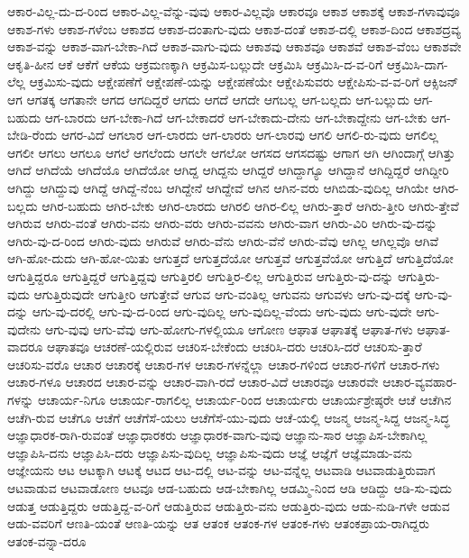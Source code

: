 {ಆಕಾರ-ವಿಲ್ಲ-ದು-ದ-ರಿಂದ
ಆಕಾರ-ವಿಲ್ಲ-ವೆನ್ನು-ವುವು
ಆಕಾರ-ವಿಲ್ಲವೊ
ಆಕಾರವೂ
ಆಕಾಶ
ಆಕಾಶಕ್ಕೆ
ಆಕಾಶ-ಗಳಾವುವೂ
ಆಕಾಶ-ಗಳು
ಆಕಾಶ-ಗಳೆಂಬ
ಆಕಾಶದ
ಆಕಾಶ-ದಂತಾಗು-ವುದು
ಆಕಾಶ-ದಂತೆ
ಆಕಾಶ-ದಲ್ಲಿ
ಆಕಾಶ-ದಿಂದ
ಆಕಾಶದ್ರವ್ಯ
ಆಕಾಶ-ವನ್ನು
ಆಕಾಶ-ವಾಗ-ಬೇಕಾ-ಗಿದೆ
ಆಕಾಶ-ವಾಗು-ವುದು
ಆಕಾಶವು
ಆಕಾಶವೂ
ಆಕಾಶವೆ
ಆಕಾಶ-ವೆಂಬ
ಆಕಾಶವೇ
ಆಕೃತಿ-ಹೀನ
ಆಕೆ
ಆಕೆಗೆ
ಆಕೆಯ
ಆಕ್ರಮಣಕ್ಕಾಗಿ
ಆಕ್ರಮಿಸ-ಬಲ್ಲುದೇ
ಆಕ್ರಮಿಸಿ
ಆಕ್ರಮಿಸಿ-ದ-ವ-ರಿಗೆ
ಆಕ್ರಮಿಸಿ-ದಾಗ-ಲೆಲ್ಲ
ಆಕ್ರಮಿಸು-ವುದು
ಆಕ್ಷೇಪಣೆಗೆ
ಆಕ್ಷೇಪಣೆ-ಯನ್ನು
ಆಕ್ಷೇಪಣೆಯೇ
ಆಕ್ಷೇಪಿಸುವರು
ಆಕ್ಷೇಪಿಸು-ವ-ವ-ರಿಗೆ
ಆಕ್ಸಿಜನ್
ಆಗ
ಆಗತಕ್ಕ
ಆಗತಾನೇ
ಆಗದ
ಆಗದಿದ್ದರೆ
ಆಗದು
ಆಗದೆ
ಆಗದೇ
ಆಗಬಲ್ಲ
ಆಗ-ಬಲ್ಲದು
ಆಗ-ಬಲ್ಲುದು
ಆಗ-ಬಹುದು
ಆಗ-ಬಾರದು
ಆಗ-ಬೇಕಾ-ಗಿದೆ
ಆಗ-ಬೇಕಾದರೆ
ಆಗ-ಬೇಕಾದು-ದೇನು
ಆಗ-ಬೇಕಾದ್ದೇನು
ಆಗ-ಬೇಕು
ಆಗ-ಬೇಡಿ-ರೆಂದು
ಆಗರ-ವಿದೆ
ಆಗಲಾರ
ಆಗ-ಲಾರದು
ಆಗ-ಲಾರರು
ಆಗ-ಲಾರವು
ಆಗಲಿ
ಆಗಲಿ-ರು-ವುದು
ಆಗಲಿಲ್ಲ
ಆಗಲೀ
ಆಗಲು
ಆಗಲೂ
ಆಗಲೆ
ಆಗಲೆಂದು
ಆಗಲೇ
ಆಗಲೋ
ಆಗಸದ
ಆಗಸದಷ್ಟು
ಆಗಾಗ
ಆಗಿ
ಆಗಿಂದಾಗ್ಗೆ
ಆಗಿತ್ತು
ಆಗಿದೆ
ಆಗಿದೆಯೆ
ಆಗಿದೆಯೊ
ಆಗಿದೆಯೋ
ಆಗಿದ್ದ
ಆಗಿದ್ದನು
ಆಗಿದ್ದರೆ
ಆಗಿದ್ದಾಗ್ಯೂ
ಆಗಿದ್ದಾನೆ
ಆಗಿದ್ದಿದ್ದರೆ
ಆಗಿದ್ದೀರಿ
ಆಗಿದ್ದು
ಆಗಿದ್ದುವು
ಆಗಿದ್ದೆ
ಆಗಿದ್ದೆ-ನೆಂಬ
ಆಗಿದ್ದೇನೆ
ಆಗಿದ್ದೇವೆ
ಆಗಿನ
ಆಗಿನ-ವರು
ಆಗಿಬಿಡು-ವುದಿಲ್ಲ
ಆಗಿಯೇ
ಆಗಿರ-ಬಲ್ಲದು
ಆಗಿರ-ಬಹುದು
ಆಗಿರ-ಬೇಕು
ಆಗಿರ-ಲಾರದು
ಆಗಿರಲಿ
ಆಗಿರ-ಲಿಲ್ಲ
ಆಗಿರು-ತ್ತಾರೆ
ಆಗಿರು-ತ್ತೀರಿ
ಆಗಿರು-ತ್ತೇವೆ
ಆಗಿರುವ
ಆಗಿರು-ವಂತೆ
ಆಗಿರು-ವನು
ಆಗಿರು-ವರು
ಆಗಿರು-ವವನು
ಆಗಿರು-ವಾಗ
ಆಗಿರು-ವಿರಿ
ಆಗಿರು-ವು-ದನ್ನು
ಆಗಿರು-ವು-ದ-ರಿಂದ
ಆಗಿರು-ವುದು
ಆಗಿರುವೆ
ಆಗಿರು-ವೆನು
ಆಗಿರು-ವೆನೆ
ಆಗಿರು-ವೆವು
ಆಗಿಲ್ಲ
ಆಗಿಲ್ಲವೊ
ಆಗಿವೆ
ಆಗಿ-ಹೋ-ದುದು
ಆಗಿ-ಹೋ-ಯಿತು
ಆಗುತ್ತದೆ
ಆಗುತ್ತದೆಯೋ
ಆಗುತ್ತವೆ
ಆಗುತ್ತವೆಯೋ
ಆಗುತ್ತಿದೆ
ಆಗುತ್ತಿದೆಯೋ
ಆಗುತ್ತಿದ್ದರೂ
ಆಗುತ್ತಿದ್ದರೆ
ಆಗುತ್ತಿದ್ದವು
ಆಗುತ್ತಿರಲಿ
ಆಗುತ್ತಿರ-ಲಿಲ್ಲ
ಆಗುತ್ತಿರುವ
ಆಗುತ್ತಿರು-ವು-ದನ್ನು
ಆಗುತ್ತಿರು-ವುದು
ಆಗುತ್ತಿರುವುದೇ
ಆಗುತ್ತೀರಿ
ಆಗುತ್ತೇವೆ
ಆಗುವ
ಆಗು-ವಂತಿಲ್ಲ
ಆಗುವನು
ಆಗುವಳು
ಆಗು-ವು-ದಕ್ಕೆ
ಆಗು-ವು-ದನ್ನು
ಆಗು-ವು-ದರಲ್ಲಿ
ಆಗು-ವು-ದ-ರಿಂದ
ಆಗು-ವುದಿಲ್ಲ
ಆಗು-ವುದಿಲ್ಲ-ವೆಂದು
ಆಗು-ವುದು
ಆಗು-ವುದೇ
ಆಗು-ವುದೇನು
ಆಗು-ವುವು
ಆಗು-ವೆವು
ಆಗು-ಹೋಗು-ಗಳಲ್ಲಿಯೂ
ಆಗೋಣ
ಆಘಾತ
ಆಘಾತಕ್ಕೆ
ಆಘಾತ-ಗಳು
ಆಘಾತ-ವಾದರೂ
ಆಘಾತವೂ
ಆಚರಣೆ-ಯಲ್ಲಿರುವ
ಆಚರಿಸ-ಬೇಕೆಂದು
ಆಚರಿಸಿ-ದರು
ಆಚರಿಸಿ-ದರೆ
ಆಚರಿಸು-ತ್ತಾರೆ
ಆಚರಿಸು-ವರೊ
ಆಚಾರ
ಆಚಾರಕ್ಕೆ
ಆಚಾರ-ಗಳ
ಆಚಾರ-ಗಳನ್ನೆಲ್ಲಾ
ಆಚಾರ-ಗಳಿಂದ
ಆಚಾರ-ಗಳಿಗೆ
ಆಚಾರ-ಗಳು
ಆಚಾರ-ಗಳೂ
ಆಚಾರದ
ಆಚಾರ-ವನ್ನು
ಆಚಾರ-ವಾಗಿ-ರದೆ
ಆಚಾರ-ವಿದೆ
ಆಚಾರವೂ
ಆಚಾರವೇ
ಆಚಾರ-ವ್ಯವಹಾರ-ಗಳನ್ನು
ಆಚಾರ್ಯ-ನಿಗೂ
ಆಚಾರ್ಯ-ರಾಗಲಿಲ್ಲ
ಆಚಾರ್ಯ-ರಿಂದ
ಆಚಾರ್ಯರು
ಆಚಾರ್ಯಶ್ರೇಷ್ಠರೇ
ಆಚೆ
ಆಚೆಗಿನ
ಆಚೆಗಿ-ರುವ
ಆಚೆಗೂ
ಆಚೆಗೆ
ಆಚೆಗೆಸೆ-ಯಲು
ಆಚೆಗೆಸೆ-ಯು-ವುದು
ಆಚೆ-ಯಲ್ಲಿ
ಆಜನ್ಮ
ಆಜನ್ಮ-ಸಿದ್ದ
ಆಜನ್ಮ-ಸಿದ್ಧ
ಆಜ್ಞಾಧಾರಕ-ರಾಗಿ-ರುವಂತೆ
ಆಜ್ಞಾಧಾರಕರು
ಆಜ್ಞಾಧಾರಕ-ವಾಗು-ವುವು
ಆಜ್ಞಾನು-ಸಾರ
ಆಜ್ಞಾಪಿಸ-ಬೇಕಾಗಿಲ್ಲ
ಆಜ್ಞಾಪಿಸಿ-ದನು
ಆಜ್ಞಾಪಿಸಿ-ದರು
ಆಜ್ಞಾಪಿಸು-ವುದಿಲ್ಲ
ಆಜ್ಞಾಪಿಸು-ವುದು
ಆಜ್ಞೆ
ಆಜ್ಞೆಗೆ
ಆಜ್ಞೆಮಾಡು-ವನು
ಆಜ್ಞೇಯನು
ಆಟ
ಆಟಕ್ಕಾಗಿ
ಆಟಕ್ಕೆ
ಆಟದ
ಆಟ-ದಲ್ಲಿ
ಆಟ-ವನ್ನು
ಆಟ-ವನ್ನೆಲ್ಲ
ಆಟವಾಡಿ
ಆಟವಾಡುತ್ತಿರುವಾಗ
ಆಟವಾಡುವ
ಆಟವಾಡೋಣ
ಆಟವೂ
ಆಡ-ಬಹುದು
ಆಡ-ಬೇಕಾಗಿಲ್ಲ
ಆಡಮ್ಮಿ-ನಿಂದ
ಆಡಿ
ಆಡಿದ್ದು
ಆಡಿ-ಸು-ವುದು
ಆಡುತ್ತ
ಆಡುತ್ತಿದ್ದರು
ಆಡುತ್ತಿದ್ದ-ವ-ರಿಗೆ
ಆಡುತ್ತಿರುವ
ಆಡುತ್ತಿರು-ವನು
ಆಡುತ್ತಿರು-ವುದು
ಆಡು-ನುಡಿ-ಗಳೇ
ಆಡುವ
ಆಡು-ವವರಿಗೆ
ಆಣತಿ-ಯಂತೆ
ಆಣತಿ-ಯನ್ನು
ಆತ
ಆತಂಕ
ಆತಂಕ-ಗಳ
ಆತಂಕ-ಗಳು
ಆತಂಕಪ್ರಾಯ-ರಾಗಿದ್ದರು
ಆತಂಕ-ವನ್ನಾ-ದರೂ
}
